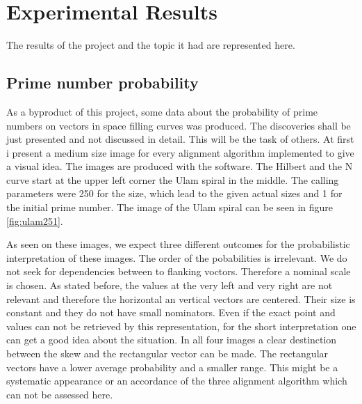 \section{Experimental Results}
\label{sec:results}
The results of the project and the topic it had are represented here.

\subsection{Prime number probability}
\label{sec:resprob}
As a byproduct of this project, some data about the probability of prime numbers on vectors in space filling curves was produced. The discoveries shall be just presented and not discussed in detail. This will be the task of others. At first i present a medium size image for every alignment algorithm implemented to give a visual idea. The images are produced with the software. The Hilbert and the N curve start at the upper left corner the Ulam spiral in the middle. The calling parameters were 250 for the size, which lead to the given actual sizes and 1 for the initial prime number. The image of the Ulam spiral can be seen in figure \ref{fig:ulam251}.

\begin{figure}[H]
\begin{minipage}[t]{0.475\textwidth}
\centering
\end{minipage}
\hfill
\begin{minipage}[t]{0.475\textwidth}
\centering
\end{minipage}
\end{figure}

As seen on these images, we expect three different outcomes for the probabilistic interpretation of these images. The order of the pobabilities is irrelevant. We do not seek for dependencies between to flanking voctors. Therefore a nominal scale is chosen. As stated before, the values at the very left and very right are not relevant and therefore the horizontal an vertical vectors are centered. Their size is constant and they do not have small nominators. Even if the exact point and values can not be retrieved by this representation, for the short interpretation one can get a good idea about the situation.
In all four images a clear destinction between the skew and the rectangular vector can be made. The rectangular vectors have a lower average probability and a smaller range. This might be a systematic appearance or an accordance of the three alignment algorithm which can not be assessed here.

